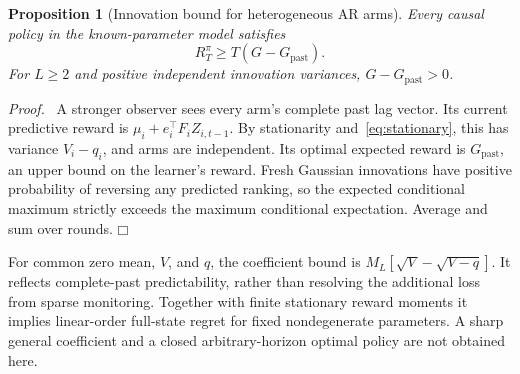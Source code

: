 \documentclass[11pt]{article}
\newtheorem{proposition}[theorem]{Proposition}
\newenvironment{proof}{\par\noindent\textit{Proof.}\ }{\hfill$\mdlgwhtsquare$\par\medskip}
\begin{document}
\begin{proposition}[Innovation bound for heterogeneous AR arms]
Every causal policy in the known-parameter model satisfies
\begin{equation}
\boxed{R_T^\pi\geq T(G-G_{\mathrm{past}}).}
\end{equation}
For $L\geq2$ and positive independent innovation variances, $G-G_{\mathrm{past}}>0$.
\end{proposition}
\begin{proof}
A stronger observer sees every arm's complete past lag vector. Its current predictive reward is $\mu_i+e_i^\top F_iZ_{i,t-1}$. By stationarity and~\eqref{eq:stationary}, this has variance $V_i-q_i$, and arms are independent. Its optimal expected reward is $G_{\mathrm{past}}$, an upper bound on the learner's reward. Fresh Gaussian innovations have positive probability of reversing any predicted ranking, so the expected conditional maximum strictly exceeds the maximum conditional expectation. Average and sum over rounds.
\end{proof}
For common zero mean, $V$, and $q$, the coefficient bound is
$M_L[\sqrt V-\sqrt{V-q}]$. It reflects complete-past predictability, rather than resolving the additional loss from sparse monitoring. Together with finite stationary reward moments it implies linear-order full-state regret for fixed nondegenerate parameters. A sharp general coefficient and a closed arbitrary-horizon optimal policy are not obtained here.
\end{document}
